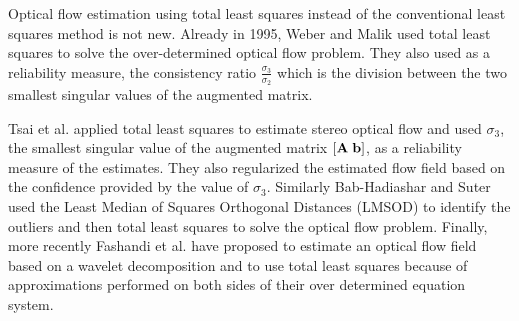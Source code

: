 
Optical flow estimation using total least squares instead of the conventional least squares method is not new. Already in 1995, Weber and Malik \cite{Weber95robustcomputation} used total least squares to solve the over-determined optical flow problem. They also used as a reliability measure, the consistency ratio $\frac{\sigma_3}{\sigma_2}$ which is the division between the two smallest singular values of the augmented matrix. 

Tsai et al. \cite{Tsai1998} applied total least squares to estimate stereo optical flow and used $\sigma_3$, the smallest singular value of the augmented matrix $[\mathbf{A} \; \mathbf{b}]$, as a reliability measure of the estimates. They also regularized the estimated flow field based on the confidence provided by the value of $\sigma_3$. Similarly Bab-Hadiashar and Suter \cite{bab1998robust, Babhadiashar98robusttotal} used the Least Median of Squares Orthogonal Distances (LMSOD) to identify the outliers and then total least squares to solve the optical flow problem. Finally, more recently Fashandi et al. \cite{Fashandi_2007} have proposed to estimate an optical flow field based on a wavelet decomposition and to use total least squares because of approximations performed on both sides of their over determined equation system. %

